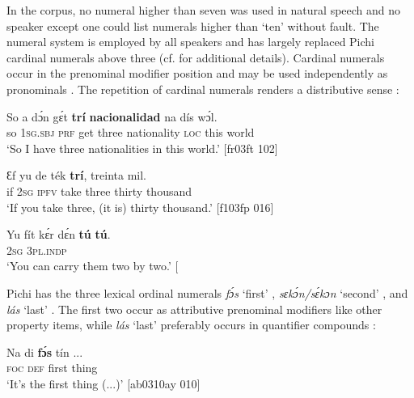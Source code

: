 In the corpus, no numeral higher than seven was used in natural speech and no speaker except one could list numerals higher than ‘ten’ without fault. The  numeral system is employed by all speakers and has largely replaced Pichi cardinal numerals above three (cf.  for additional details). Cardinal numerals occur in the prenominal modifier position  and may be used independently as pronominals . The repetition of cardinal numerals renders a distributive sense : 


\ea%
    \label{ex:key:250}
    \gll So  a    dɔ́n  gɛ́t  \textbf{trí}    \textbf{nacionalidad}    na  dís  wɔ́l.\\
so  \textsc{1sg.sbj}  \textsc{prf}  get  three  nationality    \textsc{loc}  this  world\\

\glt ‘So I have three nationalities in this world.’ [fr03ft 102]
\z


\ea%
    \label{ex:key:251}
    \gll Ɛf  yu  de  ték  \textbf{trí},    treinta  mil.\\
if  \textsc{2sg}  \textsc{ipfv}  take  three  thirty  thousand\\

\glt ‘If you take three, (it is) thirty thousand.’ [f103fp 016]
\z


\ea%
    \label{ex:key:252}
    \gll Yu  fít  kɛ́r    dɛ́n    \textbf{tú}  \textbf{tú}.\\
\textsc{2sg}   \textsc{3pl.indp}  \\
\glt ‘You can carry them two by two.’ [\textstylePichiexamplenumberZchnZchn{bo07fn 231]}
\z

Pichi has the three lexical ordinal numerals \textit{fɔ́s} ‘first’ , \textit{sɛkɔ́n/sɛ́kɔn} ‘second’ , and \textit{lás} ‘last’ . The first two occur as attributive prenominal modifiers like other property items, while \textit{lás} ‘last’ preferably occurs in quantifier compounds {\fff}: 


\ea%
    \label{ex:key:253}
    \gll Na  di  \textbf{fɔ́s}  tín  \op...\cp\\
\textsc{foc}  \textsc{def}  first  thing\\

\glt ‘It’s the first thing (...)’ [ab0310ay 010]
\z


